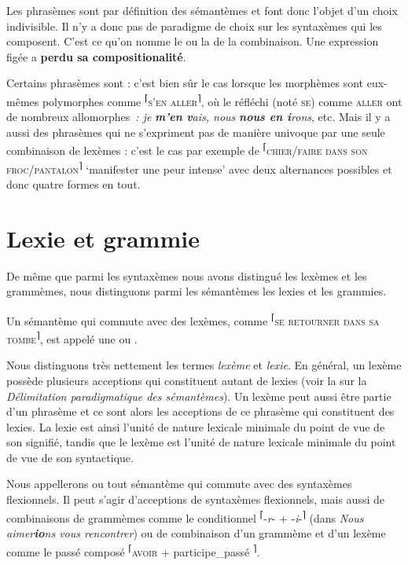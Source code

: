 Les phrasèmes sont par définition des sémantèmes et font donc l’objet d’un choix indivisible. Il n’y a donc pas de paradigme de choix sur les syntaxèmes qui les composent. C’est ce qu’on nomme le  ou la  de la combinaison. Une expression figée a \textbf{perdu sa compositionalité}.

Certains phrasèmes sont : c’est bien sûr le cas lorsque les morphèmes sont eux-mêmes polymorphes comme \textsuperscript{⌈}\textsc{s’en} \textsc{aller}\textsuperscript{⌉}, où le réfléchi (noté \textsc{se}) comme \textsc{aller} ont de nombreux allomorphes~\textit{: je} \textbf{\textit{m’en} \textit{v}}\textit{ais, nous} \textbf{\textit{nous en i}}\textit{rons}, etc. Mais il y a aussi des phrasèmes qui ne s’expriment pas de manière univoque par une seule combinaison de lexèmes : c’est le cas par exemple de \textsuperscript{⌈}\textsc{chier/faire} \textsc{dans} \textsc{son} \textsc{froc/pantalon}\textsuperscript{⌉} ‘manifester une peur intense’ avec deux alternances possibles et donc quatre formes en tout.

\section{Lexie et grammie}\label{sec:2.3.8}

De même que parmi les syntaxèmes nous avons distingué les lexèmes et les grammèmes, nous distinguons parmi les sémantèmes les lexies et les grammies.

Un sémantème qui commute avec des lexèmes, comme \textsuperscript{⌈}\textsc{se} \textsc{retourner} \textsc{dans} \textsc{sa} \textsc{tombe}\textsuperscript{⌉}, est appelé une  ou .

Nous distinguons très nettement les termes \textit{lexème} et \textit{lexie}. En général, un lexème possède plusieurs acceptions qui constituent autant de lexies (voir la  sur la \textit{Délimitation paradigmatique des sémantèmes}). Un lexème peut aussi être partie d’un phrasème et ce sont alors les acceptions de ce phrasème qui constituent des lexies. La lexie est ainsi l’unité de nature lexicale minimale du point de vue de son signifié, tandis que le lexème est l’unité de nature lexicale minimale du point de vue de son syntactique.

Nous appellerons  ou  tout sémantème qui commute avec des syntaxèmes flexionnels. Il peut s’agir d’acceptions de syntaxèmes flexionnels, mais aussi de combinaisons de grammèmes comme le conditionnel  \textsuperscript{⌈}{}-\textit{r}{}- + -\textit{i}{}-\textsuperscript{⌉} (dans \textit{Nous aimer}\textbf{\textit{io}}\textit{ns vous rencontrer}) ou de combinaison d’un grammème et d’un lexème comme le passé composé \textsuperscript{⌈}\textsc{avoir} + participe\_passé\textsuperscript{ ⌉}.

